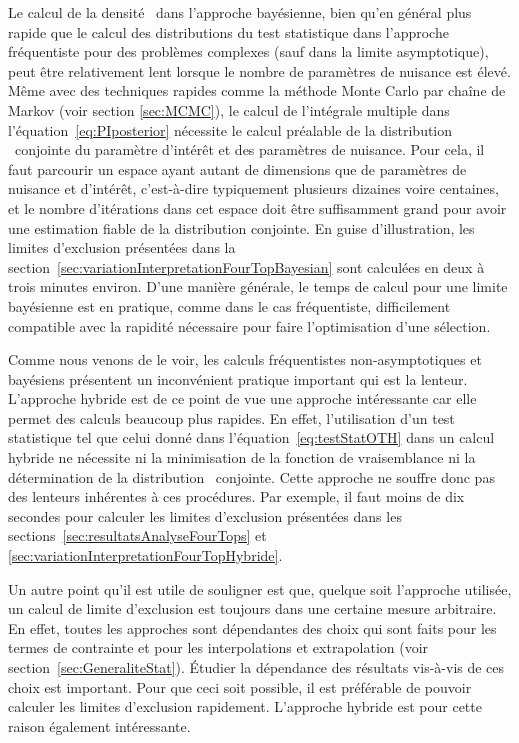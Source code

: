 Le calcul de la densit\'e \posterior~dans l'approche bay\'esienne, bien qu'en g\'en\'eral plus rapide que le calcul des distributions du test statistique dans l'approche fr\'equentiste pour des probl\`emes complexes (sauf dans la limite asymptotique), peut \^etre relativement lent lorsque le nombre de param\`etres de nuisance est \'elev\'e. M\^eme avec des techniques rapides comme la m\'ethode Monte Carlo par cha\^ine de Markov (voir section \ref{sec:MCMC}), le calcul de l'int\'egrale multiple dans l'\'equation~\ref{eq:PIposterior} n\'ecessite le calcul pr\'ealable de la distribution \posterior~conjointe du param\`etre d'int\'er\^et et des param\`etres de nuisance. Pour cela, il faut parcourir un espace ayant autant de dimensions que de param\`etres de nuisance et d'int\'er\^et, c'est-\`a-dire typiquement plusieurs dizaines voire centaines, et le nombre d'itérations dans cet espace doit \^etre suffisamment grand pour avoir une estimation fiable de la distribution conjointe. 
En guise d'illustration, les limites d'exclusion pr\'esent\'ees dans la section~\ref{sec:variationInterpretationFourTopBayesian} sont calcul\'ees en deux \`a trois minutes environ. 
D'une mani\`ere g\'en\'erale, le temps de calcul pour une limite bay\'esienne est en pratique, comme dans le cas fr\'equentiste, difficilement compatible avec la rapidit\'e nécessaire pour faire l'optimisation d'une s\'election.

Comme nous venons de le voir, les calculs fr\'equentistes non-asymptotiques et bay\'esiens pr\'esentent un inconv\'enient pratique important qui est la lenteur. L'approche hybride est de ce point de vue une approche int\'eressante car elle permet des calculs beaucoup plus rapides. En effet, l'utilisation d'un test statistique tel que celui donn\'e dans l'\'equation~\ref{eq:testStatOTH} dans un calcul hybride ne n\'ecessite ni la minimisation de la fonction de vraisemblance ni la d\'etermination de la distribution \posterior~conjointe. Cette approche ne souffre donc pas des lenteurs inh\'erentes \`a ces proc\'edures. 
Par exemple, il faut moins de dix secondes pour calculer les limites d'exclusion pr\'esent\'ees dans les sections~\ref{sec:resultatsAnalyseFourTops} et \ref{sec:variationInterpretationFourTopHybride}.


Un autre point qu'il est utile de souligner est que, quelque soit l'approche utilis\'ee, un calcul de limite d'exclusion est toujours dans une certaine mesure arbitraire. En effet, toutes les approches sont d\'ependantes des choix qui sont faits pour les termes de contrainte et pour les interpolations et extrapolation (voir section~\ref{sec:GeneraliteStat}). \'Etudier la d\'ependance des r\'esultats vis-\`a-vis de ces choix est important. Pour que ceci soit possible, il est pr\'ef\'erable de pouvoir calculer les limites d'exclusion rapidement. L'approche hybride est pour cette raison \'egalement int\'eressante.

